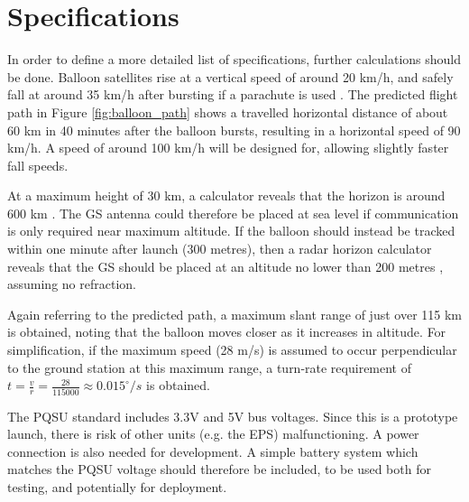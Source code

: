 \graphicspath{{./figures}}

\section{Specifications}

In order to define a more detailed list of specifications, further calculations should be done. Balloon satellites rise at a vertical speed of around 20 km/h, and safely fall at around 35 km/h after bursting if a parachute is used \cite{site-weatherWeatherBalloons}. The predicted flight path in Figure \ref{fig:balloon_path} shows a travelled horizontal distance of about 60 km in 40 minutes after the balloon bursts, resulting in a horizontal speed of 90 km/h. A speed of around 100 km/h will be designed for, allowing slightly faster fall speeds.

At a maximum height of 30 km, a calculator reveals that the horizon is around 600 km \cite{site-normalHorizon}. The GS antenna could therefore be placed at sea level if communication is only required near maximum altitude. If the balloon should instead be tracked within one minute after launch (300 metres), then a radar horizon calculator reveals that the GS should be placed at an altitude no lower than 200 metres \cite{site-radarHorizon}, assuming no refraction.

Again referring to the predicted path, a maximum slant range of just over 115 km is obtained, noting that the balloon moves closer as it increases in altitude. For simplification, if the maximum speed (28 m/s) is assumed to occur perpendicular to the ground station at this maximum range, a turn-rate requirement of $t = \frac{v}{r} = \frac{28}{115000} \approx 0.015^\circ / s$ is obtained.

The PQSU standard includes 3.3V and 5V bus voltages. Since this is a prototype launch, there is risk of other units (e.g. the EPS) malfunctioning. A power connection is also needed for development. A simple battery system which matches the PQSU voltage should therefore be included, to be used both for testing, and potentially for deployment.

